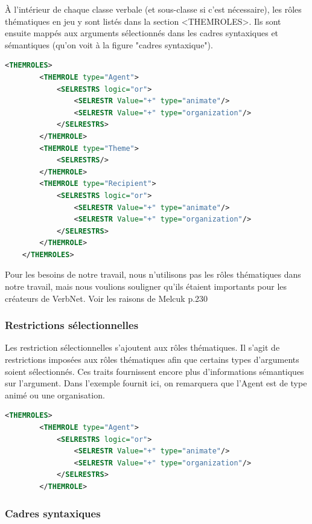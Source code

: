 À l'intérieur de chaque classe verbale (et sous-classe si c'est nécessaire), les rôles thématiques en jeu y sont listés dans la section <THEMROLES>. Ils sont ensuite mappés aux arguments sélectionnés dans les cadres syntaxiques et sémantiques (qu'on voit à la figure "cadres syntaxique").

\begin{lstlisting}[language=XML, caption = les rôles thématiques]
    <THEMROLES>
        <THEMROLE type="Agent">
            <SELRESTRS logic="or">
                <SELRESTR Value="+" type="animate"/>
                <SELRESTR Value="+" type="organization"/>
            </SELRESTRS>
        </THEMROLE>
        <THEMROLE type="Theme">
            <SELRESTRS/>
        </THEMROLE>
        <THEMROLE type="Recipient">
            <SELRESTRS logic="or">
                <SELRESTR Value="+" type="animate"/>
                <SELRESTR Value="+" type="organization"/>
            </SELRESTRS>
        </THEMROLE>
    </THEMROLES>
\end{lstlisting}

Pour les besoins de notre travail, nous n'utilisons pas les rôles thématiques dans notre travail, mais nous voulions souligner qu'ils étaient importants pour les créateurs de VerbNet. 
Voir les raisons de Melcuk p.230

\subsubsection{Restrictions sélectionnelles}

Les restriction sélectionnelles s'ajoutent aux rôles thématiques. Il s'agit de restrictions imposées aux rôles thématiques afin que certains types d'arguments soient sélectionnés.
Ces traits fournissent encore plus d'informations sémantiques sur l'argument. Dans l'exemple fournit ici, on remarquera que l'Agent est de type animé ou une organisation.

\begin{lstlisting}[language=Xml, caption = les restrictions sélectionnelles]
    <THEMROLES>
        <THEMROLE type="Agent">
            <SELRESTRS logic="or">
                <SELRESTR Value="+" type="animate"/>
                <SELRESTR Value="+" type="organization"/>
            </SELRESTRS>
        </THEMROLE>
\end{lstlisting}

\subsubsection{Cadres syntaxiques}

